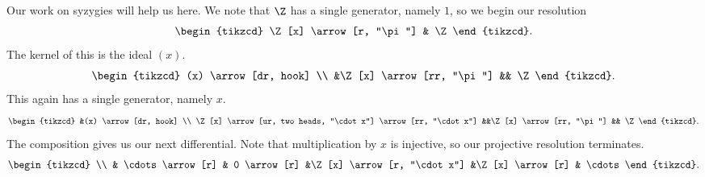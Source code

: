 \documentclass[main.tex]{subfiles}
\begin{document}
\begin{example}
  Our work on syzygies will help us here. We note that $\Z$ has a single generator, namely $1$, so we begin our resolution
  \begin{equation*}
    \begin{tikzcd}
      \Z[x]
      \arrow[r, "\pi"]
      & \Z
    \end{tikzcd}.
  \end{equation*}
  The kernel of this is the ideal $(x)$.
  \begin{equation*}
    \begin{tikzcd}
      (x)
      \arrow[dr, hook]
      \\
      &\Z[x]
      \arrow[rr, "\pi"]
      && \Z
    \end{tikzcd}.
  \end{equation*}
  This again has a single generator, namely $x$.
  \begin{equation*}
    \begin{tikzcd}
      &(x)
      \arrow[dr, hook]
      \\
      \Z[x]
      \arrow[ur, two heads, "\cdot x"]
      \arrow[rr, "\cdot x"]
      &&\Z[x]
      \arrow[rr, "\pi"]
      && \Z
    \end{tikzcd}.
  \end{equation*}
  The composition gives us our next differential. Note that multiplication by $x$ is injective, so our projective resolution terminates.
  \begin{equation*}
    \begin{tikzcd}
      \\
      & \cdots
      \arrow[r]
      & 0
      \arrow[r]
      &\Z[x]
      \arrow[r, "\cdot x"]
      &\Z[x]
      \arrow[r]
      & \cdots
    \end{tikzcd}.
  \end{equation*}


\end{example}
\end{document}
